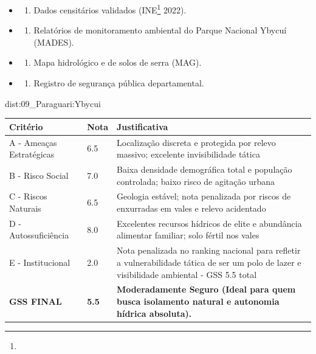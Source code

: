 {\begin{itemize}
\tightlist
\item
  \begin{enumerate}
  \def\labelenumi{\arabic{enumi})}
  \tightlist
  \item
    Dados censitários validados (INE\footnote{\fineINE} 2022).
  \end{enumerate}
\item
  \begin{enumerate}
  \def\labelenumi{\arabic{enumi})}
  \setcounter{enumi}{1}
  \tightlist
  \item
    Relatórios de monitoramento ambiental do Parque Nacional Ybycuí
    (MADES).
  \end{enumerate}
\item
  \begin{enumerate}
  \def\labelenumi{\arabic{enumi})}
  \setcounter{enumi}{2}
  \tightlist
  \item
    Mapa hidrológico e de solos de serra (MAG).
  \end{enumerate}
\item
  \begin{enumerate}
  \def\labelenumi{\arabic{enumi})}
  \setcounter{enumi}{3}
  \tightlist
  \item
    Registro de segurança pública departamental.
  \end{enumerate}
\end{itemize}}{dist:09_Paraguari:Ybycui}
\begin{table}[ht!]
\small \begin{tabular}{p{3.0cm}p{0.8cm}p{6.0cm}} \toprule
\textbf{Critério} & \textbf{Nota} & \textbf{Justificativa} \\ \midrule
A - Ameaças Estratégicas & 6.5 & Localização discreta e protegida por relevo massivo; excelente invisibilidade tática \\
B - Risco Social & 7.0 & Baixa densidade demográfica total e população controlada; baixo risco de agitação urbana \\
C - Riscos Naturais & 6.5 & Geologia estável; nota penalizada por riscos de enxurradas em vales e relevo acidentado \\
D - Autossuficiência & 8.0 & Excelentes recursos hídricos de elite e abundância alimentar familiar; solo fértil nos vales \\
E - Institucional & 2.0 & Nota penalizada no ranking nacional para refletir a vulnerabilidade tática de ser um polo de lazer e visibilidade ambiental - GSS 5.5 total \\
\midrule \textbf{GSS FINAL} & \textbf{5.5} & \textbf{Moderadamente Seguro (Ideal para quem busca isolamento natural e autonomia hídrica absoluta).} \\ \bottomrule \end{tabular}
\end{table}
